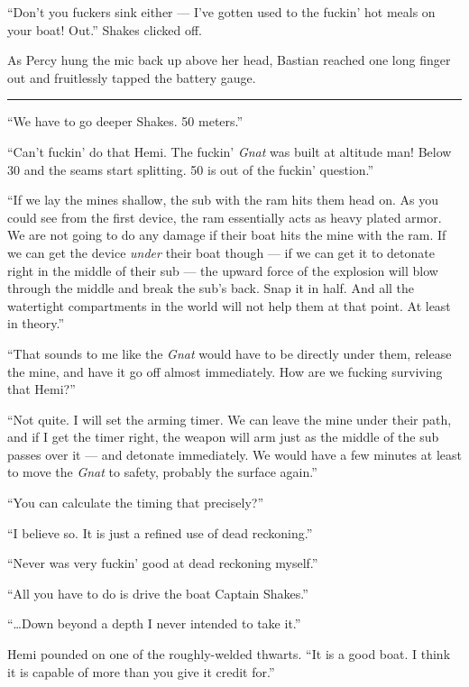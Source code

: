 \documentclass[]{scrbook}
\begin{document}
``Don't you fuckers sink either --- I've gotten used to the fuckin' hot
meals on your boat! Out.'' Shakes clicked off.

As Percy hung the mic back up above her head, Bastian reached one long
finger out and fruitlessly tapped the battery gauge.

\begin{center}\rule{0.5\linewidth}{\linethickness}\end{center}

``We have to go deeper Shakes. 50 meters.''

``Can't fuckin' do that Hemi. The fuckin' \emph{Gnat} was built at
altitude man! Below 30 and the seams start splitting. 50 is out of the
fuckin' question.''

``If we lay the mines shallow, the sub with the ram hits them head on.
As you could see from the first device, the ram essentially acts as
heavy plated armor. We are not going to do any damage if their boat hits
the mine with the ram. If we can get the device \emph{under} their boat
though --- if we can get it to detonate right in the middle of their sub
--- the upward force of the explosion will blow through the middle and
break the sub's back. Snap it in half. And all the watertight
compartments in the world will not help them at that point. At least in
theory.''

``That sounds to me like the \emph{Gnat} would have to be directly under
them, release the mine, and have it go off almost immediately. How are
we fucking surviving that Hemi?''

``Not quite. I will set the arming timer. We can leave the mine under
their path, and if I get the timer right, the weapon will arm just as
the middle of the sub passes over it --- and detonate immediately. We
would have a few minutes at least to move the \emph{Gnat} to safety,
probably the surface again.''

``You can calculate the timing that precisely?''

``I believe so. It is just a refined use of dead reckoning.''

``Never was very fuckin' good at dead reckoning myself.''

``All you have to do is drive the boat Captain Shakes.''

``\ldots{}Down beyond a depth I never intended to take it.''

Hemi pounded on one of the roughly-welded thwarts. ``It is a good boat.
I think it is capable of more than you give it credit for.''
\end{document}

